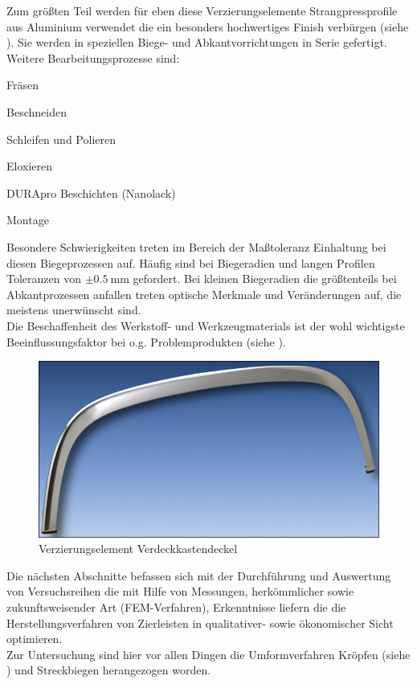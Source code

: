 \documentclass[12pt,a4paper,parskip,twoside,BCOR5mm,headsepline]{scrartcl}
\begin{document}
Zum größten Teil werden für eben diese Verzierungselemente
Strangpressprofile aus Aluminium verwendet die ein besonders hochwertiges Finish verbürgen (siehe ). Sie werden in speziellen Biege- und Abkantvorrichtungen in Serie gefertigt.
 Weitere Bearbeitungsprozesse sind: \begin{itemize*}
 \item Fräsen
 \item Beschneiden
 \item Schleifen und Polieren
 \item Eloxieren
 \item DURApro Beschichten (Nanolack)
 \item Montage
 \end{itemize*}
   Besondere Schwierigkeiten treten im Bereich der Maßtoleranz Einhaltung bei diesen Biegeprozessen auf. Häufig sind bei  Biegeradien und langen Profilen Toleranzen von $\pm \SI{0.5}{\milli\meter}$ gefordert. Bei kleinen Biegeradien die größtenteils bei Abkantprozessen anfallen treten optische Merkmale und Veränderungen auf, die meistens unerwünscht sind.\\
 Die Beschaffenheit des Werkstoff- und Werkzeugmaterials ist der wohl wichtigste Beeinflussungsfaktor bei o.g. Problemprodukten (siehe ).
 


 \begin{figure}[hbtp]
 \centering
 \includegraphics[width=.8\textwidth]{BauteilNeu}
 \caption{Verzierungselement Verdeckkastendeckel}
 \label{fig:Verdeckkastendeckel}
 \end{figure}

Die nächsten Abschnitte befassen sich mit der Durchführung und Auswertung von Versuchsreihen die mit Hilfe von Messungen, herkömmlicher sowie zukunftsweisender Art (FEM-Verfahren), Erkenntnisse liefern  die die Herstellungsverfahren von Zierleisten  in qualitativer- sowie ökonomischer Sicht  optimieren.\\
Zur Untersuchung   sind hier vor allen Dingen die Umformverfahren  Kröpfen (siehe )  und Streckbiegen herangezogen worden.
\end{document}
